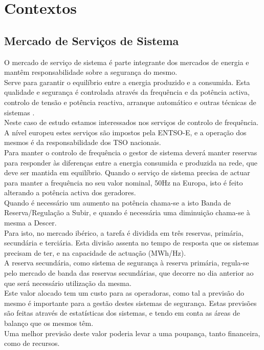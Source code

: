\chapter{Contextos\label{ch:contextos}}

\section{Mercado de Serviços de Sistema \label{se:servicos_sistema}}

O mercado de serviço de sistema é parte integrante dos mercados de energia e mantêm responsabilidade sobre a segurança do mesmo.\cite{dgegmss} \\
Serve para garantir o equilíbrio entre a energia produzido e a consumida. Esta qualidade e segurança é controlada através da frequência e da potência activa, controlo de tensão e potência reactiva, arranque automático e outras técnicas de sistemas \cite{Rassid2017} \cite{Carneiro2016}. \\
Neste caso de estudo estamos interessados nos serviços de controlo de frequência. A nível europeu estes serviços são impostos pela \gls{ENTSO-E}, e a operação dos mesmos é da responsabilidade dos \gls{TSO} nacionais.\\
Para manter o controlo de frequência o gestor de sistema deverá manter reservas para responder às diferenças entre a energia consumida e produzida na rede, que deve ser mantida em equilíbrio. Quando o serviço de sistema precisa de actuar para manter a frequência no seu valor nominal, 50Hz na Europa, isto é feito alterando a potência activa dos geradores.  \\
Quando é necessário um aumento na potência chama-se a isto Banda de Reserva/Regulação a Subir, e quando é necessária uma diminuição chama-se à mesma a Descer. \\
Para isto, no mercado ibérico, a tarefa é dividida em três reservas, primária, secundária e terciária. Esta divisão assenta no tempo de resposta que os sistemas precisam de ter, e na capacidade de actuação (MWh/Hz). \\

A reserva secundária, como sistema de segurança à reserva primária, regula-se pelo mercado de banda das reservas secundárias, que decorre no dia anterior ao que será necessário utilização da mesma. \\
Este valor alocado tem um custo para as operadoras, como tal a previsão do mesmo é importante para a gestão destes sistemas de segurança. Estas previsões são feitas através de estatísticas dos sistemas, e tendo em conta as áreas de balanço que os mesmos têm. \\
Uma melhor previsão deste valor poderia levar a uma poupança, tanto financeira, como de recursos. \\

